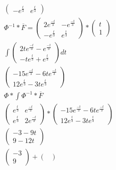 \begin{mdframed}
\begin{enumerate}
\begin{gather*}
\begin{pmatrix}
                                         -e^{\frac{t}{3}} & e^{\frac{t}{3}} 
                                        \end{pmatrix}\\
        \Phi^{-1}*\overline{F} = \begin{pmatrix}
                            2e^{\frac{-t}{3}}&  -e^{\frac{-t}{3}}\\
                            -e^{\frac{t}{3}} & e^{\frac{t}{3}} 
                            \end{pmatrix}*\begin{pmatrix}
                            t \\
                            1 
                            \end{pmatrix}\\
        \int{\begin{pmatrix}
            2te^{\frac{-t}{3}} -e^{\frac{-t}{3}}\\
            -te^{\frac{t}{3}} + e^{\frac{t}{3}} 
            \end{pmatrix} dt}\\
        \begin{pmatrix}
            -15e^{\frac{-t}{3}} -6te^{\frac{-t}{3}}\\
            12e^{\frac{t}{3}} - 3te^{\frac{t}{3}} 
        \end{pmatrix}\\
        \Phi*\int{\Phi^{-1}*\overline{F}}\\
        \begin{pmatrix}
                 e^{\frac{t}{3}}&  e^{\frac{-t}{3}}\\
                 e^{\frac{t}{3}} & 2 e^{\frac{-t}{3}} 
        \end{pmatrix} 
        * \begin{pmatrix}
            -15e^{\frac{-t}{3}} -6te^{\frac{-t}{3}}\\
            12e^{\frac{t}{3}} - 3te^{\frac{t}{3}} 
        \end{pmatrix}\\
        \begin{pmatrix}
            -3-9t\\
            9-12t 
        \end{pmatrix}\\
        \begin{pmatrix}
                -3 \\
                9 
        \end{pmatrix}+\begin{pmatrix}

\end{pmatrix}
\end{gather*}
\end{enumerate}
\end{mdframed}
